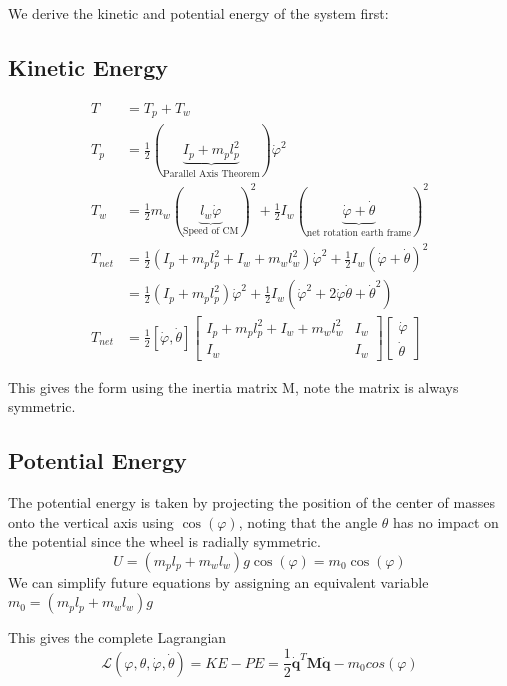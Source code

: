\documentclass[11pt]{article}
\begin{document}
We derive the kinetic and potential energy of the system first:

\subsection{Kinetic Energy}

\begin{align*} 
T &= T_p+T_w \\
T_p &= \frac{1}{2}(\underbrace{I_p + m_pl_p^2}_{\text{Parallel Axis Theorem}})\dot{\varphi}^2\\
T_w&=\frac{1}{2}m_w(\underbrace{l_w\dot{\varphi}}_{\text{Speed of CM}})^2 +  \frac{1}{2}I_w(\underbrace{\dot{\varphi}+\dot{\theta}}_{\text{net rotation earth frame}})^2\\
T_{net} &= \frac{1}{2} \left(I_p + m_p l_p^2 + I_w + m_w l_w^2\right) \dot{\varphi}^2 + \frac{1}{2} I_w (\dot{\varphi} + \dot{\theta})^2 \\
&= \frac{1}{2} \left(I_p + m_p l_p^2\right) \dot{\varphi}^2 + \frac{1}{2} I_w \left(\dot{\varphi}^2 + 2\dot{\varphi}\dot{\theta} + \dot{\theta}^2\right)\\
T_{net}&=\frac{1}{2} [\dot{\varphi}, \dot{\theta}] \begin{bmatrix}
    I_p + m_pl_p^2 + I_w + m_wl_w^2 & I_w \\
    I_w & I_w
\end{bmatrix} \begin{bmatrix}
    \dot{\varphi} \\
 \dot{\theta}
\end{bmatrix}
\end{align*}

This gives the form using the inertia matrix M, note the matrix is always symmetric.

\subsection{Potential Energy}
The potential energy is taken by projecting the position of the center of masses onto the vertical axis using $\cos(\varphi)$, noting that the angle $\theta$ has no impact on the potential since the wheel is radially symmetric.  
$$U = (m_pl_p + m_wl_w)g \cos (\varphi) = m_0 \cos (\varphi)$$
We can simplify future equations by assigning an equivalent variable $m_0 = (m_p l_p + m_w l_w)g$


This gives the complete Lagrangian  $$\mathcal{L}(\varphi,\theta,\dot \varphi,\dot \theta)= KE - PE = \frac{1}{2}\mathbf{\dot q}^{T}\mathbf{M}\mathbf{\dot q}-m_0cos(\varphi)$$
\end{document}

